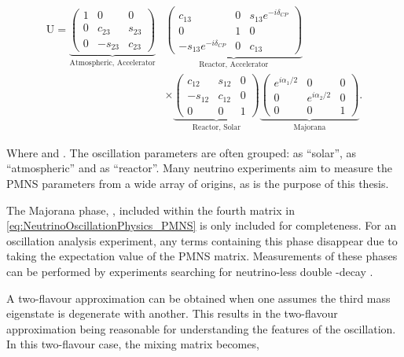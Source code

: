 \begin{equation}
  \label{eq:NeutrinoOscillationPhysics_PMNS}
  \begin{split}
  \mathrm{U} =
  \underbrace{\begin{pmatrix} 1 & 0 & 0 \\ 0 & c_{23} & s_{23} \\ 0 & -s_{23} & c_{23} \end{pmatrix}}_{\text{Atmospheric, Accelerator}} &
  \underbrace{\begin{pmatrix} c_{13} & 0 & s_{13}e^{-i \delta_{CP}} \\ 0 & 1 & 0 \\ -s_{13}e^{-i \delta_{CP}} & 0 & c_{13} \end{pmatrix}}_{\text{Reactor, Accelerator}} \\
  & \times \underbrace{\begin{pmatrix} c_{12} & s_{12} & 0 \\ -s_{12} & c_{12} & 0 \\ 0 & 0 & 1 \end{pmatrix}}_{\text{Reactor, Solar}}
  \underbrace{\begin{pmatrix} e^{i\alpha_{1}/2} & 0 & 0 \\ 0 & e^{i\alpha_{2}/2} & 0 \\ 0 & 0 & 1 \end{pmatrix}}_{\text{Majorana}}.
  \end{split}
\end{equation}

Where  and . The oscillation parameters are often grouped:  as ``solar'',  as ``atmospheric'' and  as ``reactor''. Many neutrino experiments aim to measure the PMNS parameters from a wide array of origins, as is the purpose of this thesis.

The Majorana phase, , included within the fourth matrix in \autoref{eq:NeutrinoOscillationPhysics_PMNS} is only included for completeness. For an oscillation analysis experiment, any terms containing this phase disappear due to taking the expectation value of the PMNS matrix. Measurements of these phases can be performed by experiments searching for neutrino-less double \quickmath{\beta}-decay \cite{Maio_2015}.

A two-flavour approximation can be obtained when one assumes the third mass eigenstate is degenerate with another. This results in the two-flavour approximation being reasonable for understanding the features of the oscillation. In this two-flavour case, the mixing matrix becomes,

